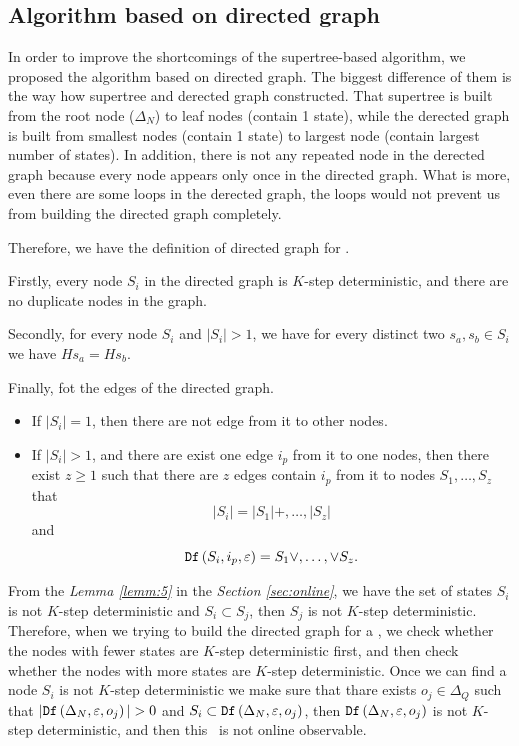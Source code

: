 \subsection{Algorithm based on directed graph}
In order to improve the shortcomings of the supertree-based algorithm, we proposed the algorithm based on directed graph. The biggest difference of them is the way how supertree and derected graph constructed. That supertree is built from the root node ($\Delta_N$) to leaf nodes (contain 1 state), while the derected graph is built from smallest nodes (contain 1 state) to largest node (contain largest number of states). In addition, there is not any repeated node in the derected graph because every node appears only once in the directed graph. What is more, even there are some loops in the derected graph, the loops would not prevent us from building the directed graph completely.

Therefore, we have the definition of directed graph for \BCNs.
\begin{definition}
Firstly, every node $S_i$ in the directed graph is $K$-step deterministic, and there are no duplicate nodes in the graph. 

Secondly, for every node $S_i$  and $|S_i|>1$, we have for every distinct two $s_a, s_b \in S_i$ we have $Hs_a=Hs_b$. 

Finally, fot the edges of the directed graph. 
\begin{itemize}
 \item If $|S_i|=1$, then there are not edge from it to other nodes.
 \item  If $|S_i|>1$, and there are exist one edge $i_p$ from it to one nodes, then there exist $z\ge 1$ such that there are $z$ edges contain $i_p$ from it to nodes $S_1,\ldots,S_z$ that \[|S_i|= |S_1|+,\ldots,|S_z|\] and \[{\tt Df}\left(S_i,i_p,\varepsilon\right)=S_1\vee,\ldots,\vee S_z.\]
 \end{itemize}

\end{definition}

From the {\em Lemma \ref{lemm:5}} in the {\em Section \ref{sec:online}}, we have the set of states $S_i$ is not $K$-step deterministic and $S_i\subset S_j$, then $S_j$ is not $K$-step deterministic. Therefore, when we trying to build the directed graph for a \BCN, we check whether the nodes with fewer states are $K$-step deterministic first, and then check whether the nodes with more states are $K$-step deterministic. Once we can find a node $S_i$ is not $K$-step deterministic we make sure that 
thare exists $o_j \in \Delta_Q$ such that $|\Ded\left(\Delta_N,\varepsilon, o_j\right)|> 0$ and $S_i\subset {\tt Df}\left(\Delta_N,\varepsilon, o_j\right)$, then ${\tt Df}\left(\Delta_N,\varepsilon,o_j\right)$ is not $K$-step deterministic, and then this \BCN\ is not online observable. %

